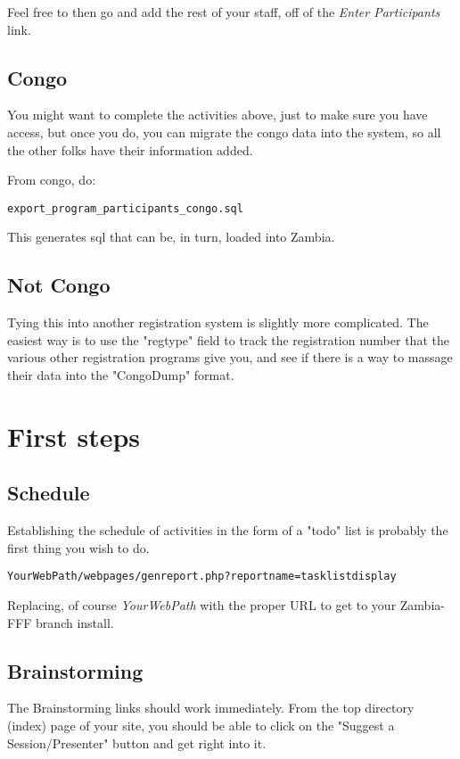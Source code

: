 \documentclass[captions=tablesignature]{scrartcl}
\begin{document}
Feel free to then go and add the rest of your staff, off of the
\emph{Enter Participants} link.

\subsection{Congo}
\label{sec-7-2}
You might want to complete the activities above, just to make sure
you have access, but once you do, you can migrate the congo data
into the system, so all the other folks have their information
added.

From congo, do:
\begin{verbatim}
export_program_participants_congo.sql
\end{verbatim}

This generates sql that can be, in turn, loaded into Zambia.
\subsection{Not Congo}
\label{sec-7-3}
Tying this into another registration system is slightly more
complicated.  The easiest way is to use the "regtype" field to
track the registration number that the various other registration
programs give you, and see if there is a way to massage their data
into the "CongoDump" format.

\section{First steps}
\label{sec-8}
\subsection{Schedule}
\label{sec-8-1}
Establishing the schedule of activities in the form of a "todo"
list is probably the first thing you wish to do.

\begin{verbatim}
YourWebPath/webpages/genreport.php?reportname=tasklistdisplay
\end{verbatim}

Replacing, of course \emph{YourWebPath} with the proper URL to get to
your Zambia-FFF branch install.

\subsection{Brainstorming}
\label{sec-8-2}
The Brainstorming links should work immediately.  From the top
directory (index) page of your site, you should be able to click on
the "Suggest a Session/Presenter" button and get right into it.
\end{document}
